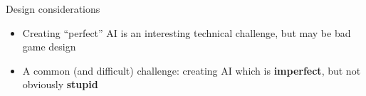 \begin{frame}{Design considerations}
	\begin{itemize}
		\pause\item Creating ``perfect'' AI is an interesting technical challenge, but may be bad game design
	\end{itemize}
	\pause
	\begin{algorithmic}
				\State {}
				\State {}
			\EndWhile
		\EndProcedure
	\end{algorithmic}
	\begin{itemize}
		\pause\item A common (and difficult) challenge: creating AI which is \textbf{imperfect},
			but not obviously \textbf{stupid}
	\end{itemize}
\end{frame}

